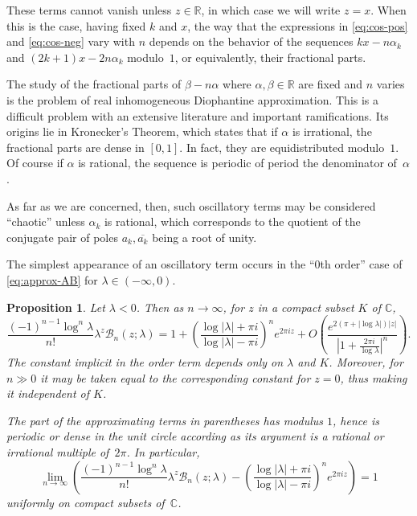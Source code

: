 \documentclass[11pt,a4paper]{amsart}
\newcommand{\R}{\mathbb{R}}
\newcommand{\C}{\mathbb{C}}
\newcommand{\B}{\mathcal{B}}
\theoremstyle{plain}
\newtheorem{prop}[theorem]{Proposition}
\theoremstyle{remark}
\begin{document}
These terms cannot vanish unless $z \in \R$, in which case we will write $z = x$. When this is the case, having fixed $k$ and $x$, the way that the expressions in \eqref{eq:cos-pos} and \eqref{eq:cos-neg} vary with $n$ depends on the behavior of the sequences $kx - n \alpha_{k}$ and $(2k+1)x - 2n\alpha_{k}$ modulo~$1$, or equivalently, their fractional parts. 

The study of the fractional parts of $\beta - n \alpha$ where $\alpha,\beta \in \R$ are fixed and $n$ varies is the problem of real inhomogeneous Diophantine approximation. This is a difficult problem with an extensive literature and important ramifications. Its origins lie in Kronecker's Theorem, which states that if $\alpha$ is irrational, the fractional parts are dense in $[0,1]$. In fact, they are equidistributed modulo~$1$.
Of course if $\alpha$ is rational, the sequence is periodic of period the denominator of~$\alpha$. 


As far as we are concerned, then, such oscillatory terms may be considered ``chaotic'' unless
$\alpha_{k}$ is rational, which corresponds to the quotient of the conjugate pair of poles 
$a_{k}, \overline{a_{k}}$ being a root of unity.

The simplest appearance of an oscillatory term occurs in the ``0th order'' case of \eqref{eq:approx-AB} for 
$\lambda \in (-\infty,0)$.

\begin{prop}
\label{prop:l<0}
Let $\lambda < 0$. Then as $n \to \infty$, for $z$ in a compact subset $K$ of $\C$,
$$
	  \frac{(-1)^{n-1}\log^{n}\lambda}{n!} \lambda^{z} \B_{n}(z;\lambda)
	= 1 + \left(\frac{\log|\lambda|+\pi i}{\log|\lambda|-\pi i}\right)^{n} e^{2\pi i z}
	  + O\left(
	     \frac{e^{2(\pi + |\log\lambda|)|z|}}{\left|1 + \frac{2\pi i}{\log\lambda}\right|^{n}}
	     \right).
$$
The constant implicit in the order term depends only on $\lambda$ and $K$. Moreover, for $n \gg 0$ it may be taken equal to the corresponding constant for $z=0$, thus making it independent of $K$.

The part of the approximating terms in parentheses has modulus $1$, hence is periodic or dense in the unit circle according as its argument is a rational or irrational multiple of~$2\pi$.
In particular,
$$
	  \lim_{n \to \infty}
	  \left( \frac{(-1)^{n-1}\log^{n}\lambda}{n!} \lambda^{z} \B_{n}(z;\lambda)
	- \left(\frac{\log|\lambda|+\pi i}{\log|\lambda|-\pi i}\right)^{n} e^{2\pi i z} \right)
	= 1
$$
uniformly on compact subsets of~$\C$.
\end{prop}
\end{document}

